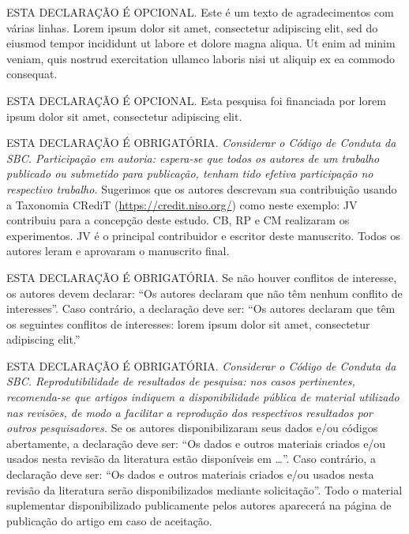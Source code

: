 \documentclass[portuguese]{sbcreviews-2025}%
\begin{document}
\begin{declarations}

\begin{acknowledgements}
ESTA DECLARAÇÃO É OPCIONAL. Este é um texto de agradecimentos com várias linhas. Lorem ipsum dolor sit amet, consectetur adipiscing elit, sed do eiusmod tempor incididunt ut labore et dolore magna aliqua. Ut enim ad minim veniam, quis nostrud exercitation ullamco laboris nisi ut aliquip ex ea commodo consequat.
\end{acknowledgements}


\begin{funding}
ESTA DECLARAÇÃO É OPCIONAL. Esta pesquisa foi financiada por lorem ipsum dolor sit amet, consectetur adipiscing elit.
\end{funding}

\begin{contributions}
ESTA DECLARAÇÃO É OBRIGATÓRIA. 
\textit{Considerar o Código de Conduta da SBC.
Participação em autoria: espera-se que todos os autores de um trabalho publicado 
ou submetido para publicação, tenham tido efetiva participação no respectivo trabalho.}
Sugerimos que os autores descrevam sua contribuição usando 
a Taxonomia CRediT (\href{https://credit.niso.org/}{https://credit.niso.org/}) como neste exemplo: 
JV contribuiu para a concepção deste estudo. CB, RP e CM realizaram os experimentos. 
JV é o principal contribuidor e escritor deste manuscrito. 
Todos os autores leram e aprovaram o manuscrito final. 
\end{contributions}

\begin{interests}
ESTA DECLARAÇÃO É OBRIGATÓRIA. 
Se não houver conflitos de interesse, os autores devem declarar: 
``Os autores declaram que não têm nenhum conflito de interesses''. 
Caso contrário, a declaração deve ser: 
``Os autores declaram que têm os seguintes conflitos de interesses: 
lorem ipsum dolor sit amet, consectetur adipiscing elit.''
\end{interests}

\begin{materials}
ESTA DECLARAÇÃO É OBRIGATÓRIA. 
\textit{Considerar o Código de Conduta da SBC. 
Reprodutibilidade de resultados de pesquisa: 
nos casos pertinentes, recomenda-se que artigos indiquem 
a disponibilidade pública de material utilizado nas revisões, 
de modo a facilitar a reprodução dos respectivos resultados por outros pesquisadores.}
%
Se os autores disponibilizaram seus dados e/ou códigos abertamente, a declaração deve ser: 
``Os dados e outros materiais criados e/ou usados nesta revisão da literatura
estão disponíveis em \ldots''. 
Caso contrário, a declaração deve ser: 
``Os dados e outros materiais criados e/ou usados nesta revisão da literatura 
serão disponibilizados mediante solicitação''. 
%
Todo o material suplementar disponibilizado publicamente pelos autores aparecerá 
na página de publicação do artigo em caso de aceitação. 
\end{materials}


\end{declarations}
\end{document}
